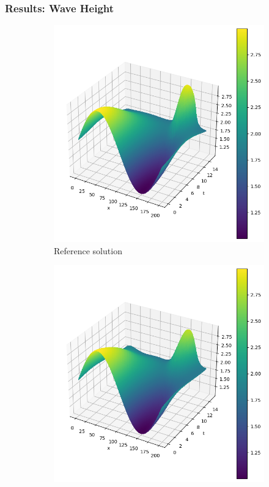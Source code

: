 \begin{frame}
    \frametitle{Results: Wave Height}

    \begin{figure}
        \centering
        \begin{subfigure}[b]{0.45\textwidth}
            \centering
            \includegraphics[width=\textwidth]{images/homogeneous_pseudospectral_swe_height.png}
            \caption{Reference solution}
            \label{fig:10_homogeneous_pseudospectral_swe_height}
        \end{subfigure}
        \hfill
        \begin{subfigure}[b]{0.45\textwidth}
            \centering
            \includegraphics[width=\textwidth]{images/homogeneous_pinn_swe_height.png}

\end{subfigure}
\end{figure}
\end{frame}
